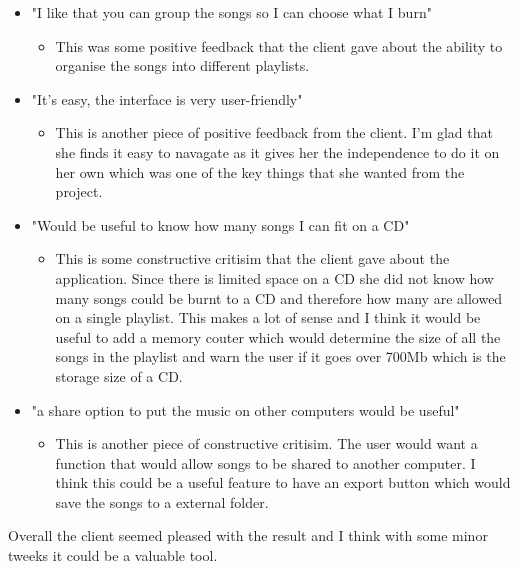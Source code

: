 \documentclass{article}
\begin{document}
\begin{itemize}
    \item "I like that you can group the songs so I can choose what I burn"
    \begin{itemize}
        \item This was some positive feedback that the client gave about the ability to
            organise the songs into different playlists.
    \end{itemize}
    \item "It's easy, the interface is very user-friendly"
    \begin{itemize}
        \item This is another piece of positive feedback from the client. I'm glad that
            she finds it easy to navagate as it gives her the independence to do it on her
            own which was one of the key things that she wanted from the project.
    \end{itemize}
    \item "Would be useful to know how many songs I can fit on a CD"
    \begin{itemize}
        \item This is some constructive critisim that the client gave about the application.
            Since there is limited space on a CD she did not know how many songs could be burnt
            to a CD and therefore how many are allowed on a single playlist. This makes a lot of
            sense and I think it would be useful to add a memory couter which would determine
            the size of all the songs in the playlist and warn the user if it goes over 700Mb
            which is the storage size of a CD.
    \end{itemize}
    \item "a share option to put the music on other computers would be useful"
    \begin{itemize}
        \item This is another piece of constructive critisim. The user would want a function
            that would allow songs to be shared to another computer. I think this could be a
            useful feature to have an export button which would save the songs to a external
            folder.
    \end{itemize}
\end{itemize}

Overall the client seemed pleased with the result and I think with some minor tweeks it could
be a valuable tool.
\end{document}
